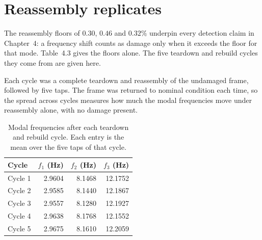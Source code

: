 %
%
%

\section{Reassembly replicates}
\label{app:reassembly}

The reassembly floors of $0.30$, $0.46$ and $0.32\%$ underpin every detection
claim in Chapter~4: a frequency shift counts as damage only when it exceeds the
floor for that mode. Table~4.3 gives the floors alone. The five teardown and
rebuild cycles they come from are given here.

Each cycle was a complete teardown and reassembly of the undamaged frame,
followed by five taps. The frame was returned to nominal condition each time, so
the spread across cycles measures how much the modal frequencies move under
reassembly alone, with no damage present.

\begin{table}[htbp]
\centering
\caption{Modal frequencies after each teardown and rebuild cycle. Each entry is
the mean over the five taps of that cycle.}
\label{tab:reassembly-cycles}
\begin{tabular}{lrrr}
\toprule
Cycle & $f_1$ (Hz) & $f_2$ (Hz) & $f_3$ (Hz) \\
\midrule
Cycle 1 & 2.9604 & 8.1468 & 12.1752 \\
Cycle 2 & 2.9585 & 8.1440 & 12.1867 \\
Cycle 3 & 2.9557 & 8.1280 & 12.1927 \\
Cycle 4 & 2.9638 & 8.1768 & 12.1552 \\
Cycle 5 & 2.9675 & 8.1610 & 12.2059 \\
\bottomrule
\end{tabular}
\end{table}

